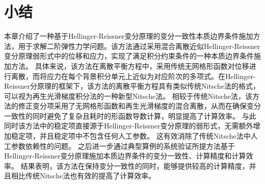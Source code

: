 \section{小结}
本章介绍了一种基于Hellinger-Reissner变分原理的变分一致性本质边界条件施加方法，用于求解二阶弹性力学问题。该方法通过采用混合离散近似Hellinger-Reissner变分原理弱形式中的位移和应力，实现了满足积分约束条件的一种本质边界条件施加方法。
具体来说，该方法在离散平衡方程中，采用传统无网格形函数对位移进行离散，而将应力在每个背景积分单元上近似为对应阶次的多项式。在Hellinger-Reissner分原理的框架下，该方法的离散平衡方程具有类似传统Nitsche法的格式，可以视为再生光滑梯度积分法的一种新型Nitsche法。
相较于传统Nitsche法，该方法的修正变分项采用了无网格形函数和再生光滑梯度的混合离散，从而在确保变分一致性的同时避免了复杂且耗时的形函数导数计算，明显提高了计算效率。
与此同时该方法中的稳定项直接源于Hellinger-Reissner变分原理的弱形式，无需额外增加稳定项，并且稳定项中不包含任何人工参数。
这有效消除了传统Nitsche法中人工参数依赖性的问题。
之后进一步通过典型算例的系统验证所提方法基于Hellinger-Reissner变分原理施加本质边界条件的变分一致性、计算精度和计算效率。
结果表明，该方法在保持变分一致性的同时，能够提供较高的计算精度，并且相比传统Nitsche法也有效的提高了计算效率。

